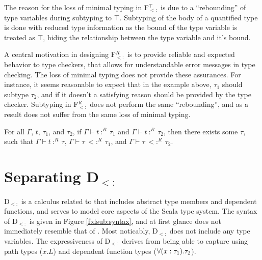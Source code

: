 \documentclass[runningheads]{llncs}
\begin{document}
The reason for the loss of minimal typing in F$_{<:}^\top$ is due to a ``rebounding'' of type variables during subtyping 
to $\top$. Subtyping of the body of a quantified type is done with reduced type information as the bound of the 
type variable is treated as $\top$, hiding the relationship between the type variable and it's bound.

A central motivation in designing F$_{<:}^R$ is to provide reliable and expected behavior to type checkers, that allows for understandable
error messages in type checking. The loss of minimal typing does not provide these assurances. For instance, it seems reasonable to 
expect that in the example above, $\tau_1$ should subtype $\tau_2$, and if it doesn't a satisfying reason should be 
provided by the type checker. Subtyping in F$_{<:}^R$ does not perform the same ``rebounding'', and as a result does 
not suffer from the same loss of minimal typing.

\begin{theorem}
For all $\Gamma$, $t$, $\tau_1$, and $\tau_2$, if $\Gamma \vdash t\ :^R\ \tau_1$ and $\Gamma \vdash t\ :^R\ \tau_2$, 
then there exists some $\tau$, such that  $\Gamma \vdash t\ :^R\ \tau$, $\Gamma \vdash \tau\ <:^R\ \tau_1$, and 
$\Gamma \vdash \tau\ <:^R\ \tau_2$.
\end{theorem}




%
%
%
%
%

\section{Separating D$_{<:}$}

D$_{<:}$ is a calculus related to \Fsub that includes abstract type members and dependent functions, and serves to model core aspects of 
the Scala type system. The syntax of D$_{<:}$ is given in Figure \ref{f:dsub:syntax}, and at first glance does not immediately resemble 
that of \Fsub. Most noticably, D$_{<:}$ does not include any type variables. The expressiveness of D$_{<:}$ derives from being able to capture
\Fsub using  path types ($x.L$) and dependent function types ($\forall (x:\tau_1).\tau_2$). 
\end{document}
